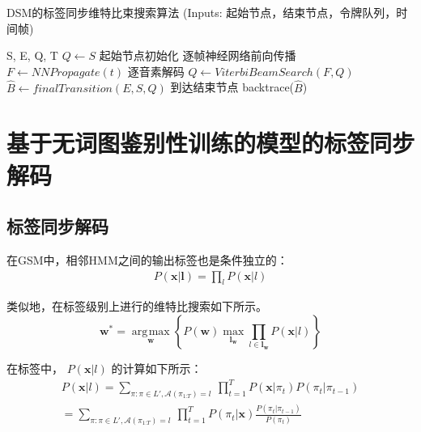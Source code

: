 \begin{algorithm}[ht]
\caption{DSM的标签同步维特比束搜索算法 \textcolor[rgb]{0,0.5,0}{(Inputs: 起始节点，结束节点，令牌队列，时间帧)}}
\label{code:lsd-dsm-alg}
\begin{algorithmic}[1]
 {S, E, Q, T}
\State $Q \leftarrow S$ \Comment \textcolor[rgb]{0,0.5,0}{起始节点初始化}
    \Comment \textcolor[rgb]{0,0.5,0}{逐帧神经网络前向传播}
\State $F \leftarrow NNPropagate(t)$
   \Comment \textcolor[rgb]{0,0.5,0}{逐音素解码}
\State  $Q\leftarrow ViterbiBeamSearch(F, Q)$
\EndIf
\EndFor
\State $\hat B\leftarrow finalTransition(E,S,Q)$ \Comment \textcolor[rgb]{0,0.5,0}{到达结束节点}
\State backtrace($\hat B$)
\EndProcedure
\end{algorithmic}
\end{algorithm}


\section{基于无词图鉴别性训练的模型的标签同步解码}
\label{chap:lsd-lfmmi}

\subsection{标签同步解码}
\label{chap:lsd-lsd-hmm}

在GSM中，相邻HMM之间的输出标签也是条件独立的：
\begin{equation} \label{eq:viterbi-blk-hmm}
  \begin{split}
        P(\mathbf{x}|\mathbf{l}) 
        = \prod_{l} P(\mathbf{x}|l) \end{split}
       \end{equation}

类似地，在标签级别上进行的维特比搜索如下所示。
\begin{equation} \label{eq:gsm-dec-lsd}
   \mathbf{w}^* = \mathop{\arg\!\max}\limits_\mathbf{w} \left\{
        P(\mathbf{w})
        \mathop{\max}\limits_{\mathbf{l}_\mathbf{w}}  \prod_{l\in\mathbf{l}_\mathbf{w}} P(\mathbf{x}|l)\right\}
     \end{equation}

在标签中， $P(\mathbf{x}|l)$ 的计算如下所示：
\begin{equation} \label{eq:viterbi-blk-gsm}
  \begin{split}
        P(\mathbf{x}|l)
        = \sum_{\pi:\pi \in L',\mathcal{A}(\pi_{1\mathord{:}T})=l}
          \ \prod_{t=1}^{T} P(\mathbf{x}|\pi_t)P(\pi_t|\pi_{t-1})\\
= \sum_{\pi:\pi \in L',\mathcal{A}(\pi_{1\mathord{:}T})=l}
          \ \prod_{t=1}^{T} P(\pi_t|\mathbf{x})\frac{P(\pi_t|\pi_{t-1})}{P(\pi_t)}
        \end{split}
       \end{equation}  

